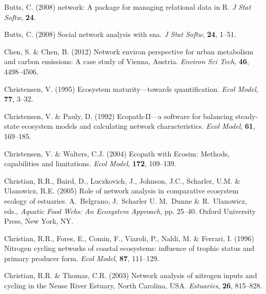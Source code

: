 \documentclass[11pt]{article}
\begin{document}
\begin{thebibliography}{79}
Butts, C. (2008{}) network: A package for managing relational data
  in {R}.
\newblock \emph{J Stat Softw}, \textbf{24}.

Butts, C. (2008{}) Social network analysis with sna.
\newblock \emph{J Stat Softw}, \textbf{24}, 1--51.

Chen, S. \& Chen, B. (2012) Network environ perspective for urban metabolism
  and carbon emissions: A case study of {Vienna, A}ustria.
\newblock \emph{Environ Sci Tech}, \textbf{46}, 4498--4506.

Christensen, V. (1995) Ecosystem maturity---towards quantification.
\newblock \emph{Ecol Model}, \textbf{77}, 3--32.

Christensen, V. \& Pauly, D. (1992) Ecopath-{II}---a software for balancing
  steady-state ecosystem models and calculating network characteristics.
\newblock \emph{Ecol Model}, \textbf{61}, 169--185.

Christensen, V. \& Walters, C.J. (2004) Ecopath with {E}cosim: {M}ethods,
  capabilities and limitations.
\newblock \emph{Ecol Model}, \textbf{172}, 109--139.

Christian, R.R., Baird, D., Luczkovich, J., Johnson, J.C., Scharler, U.M. \&
  Ulanowicz, R.E. (2005) Role of network analysis in comparative ecosystem
  ecology of estuaries.
\newblock A.~Belgrano, J.~Scharler U. M.~Dunne \& R.~Ulanowicz, eds.,
  \emph{Aquatic Food Webs: An Ecosystem Approach}, pp. 25--40. Oxford
  University Press, New York, NY.

Christian, R.R., Fores, E., Comin, F., Viaroli, P., Naldi, M. \& Ferrari, I.
  (1996) Nitrogen cycling networks of coastal ecosystems: influence of trophic
  status and primary producer form.
\newblock \emph{Ecol Model}, \textbf{87}, 111--129.

Christian, R.R. \& Thomas, C.R. (2003) Network analysis of nitrogen inputs and
  cycling in the {Neuse River Estuary, North Carolina, USA}.
\newblock \emph{Estuaries}, \textbf{26}, 815--828.


\end{thebibliography}
\end{document}
